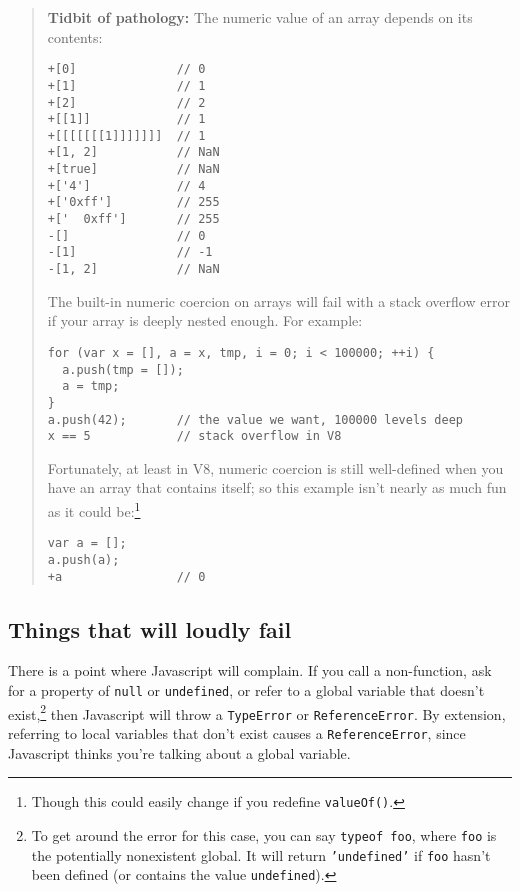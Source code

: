 \documentclass{article}
\begin{document}
    \begin{quote}
      {\bf Tidbit of pathology:} The numeric value of an array depends on its contents:

\begin{verbatim}
+[0]              // 0
+[1]              // 1
+[2]              // 2
+[[1]]            // 1
+[[[[[[[1]]]]]]]  // 1
+[1, 2]           // NaN
+[true]           // NaN
+['4']            // 4
+['0xff']         // 255
+['  0xff']       // 255
-[]               // 0
-[1]              // -1
-[1, 2]           // NaN
\end{verbatim}

      The built-in numeric coercion on arrays will fail with a stack overflow error if your array is deeply nested enough. For example:

\begin{verbatim}
for (var x = [], a = x, tmp, i = 0; i < 100000; ++i) {
  a.push(tmp = []);
  a = tmp;
}
a.push(42);       // the value we want, 100000 levels deep
x == 5            // stack overflow in V8
\end{verbatim}

      Fortunately, at least in V8, numeric coercion is still well-defined when you have an array that contains itself; so this example isn't nearly as much fun as it could be:\footnote{Though
      this could easily change if you redefine {\tt valueOf()}.}

\begin{verbatim}
var a = [];
a.push(a);
+a                // 0
\end{verbatim}
    \end{quote}


\subsection {Things that will loudly fail}
    There is a point where Javascript will complain. If you call a non-function, ask for a property of \verb|null| or \verb|undefined|, or refer to a global variable that doesn't
    exist,\footnote{To get around the error for this case, you can say {\tt typeof foo}, where {\tt foo} is the potentially nonexistent global. It will return {\tt 'undefined'} if
    {\tt foo} hasn't been defined (or contains the value {\tt undefined}).} then Javascript will throw a \verb|TypeError| or \verb|ReferenceError|. By extension, referring to local variables
    that don't exist causes a \verb|ReferenceError|, since Javascript thinks you're talking about a global variable.
\end{document}
